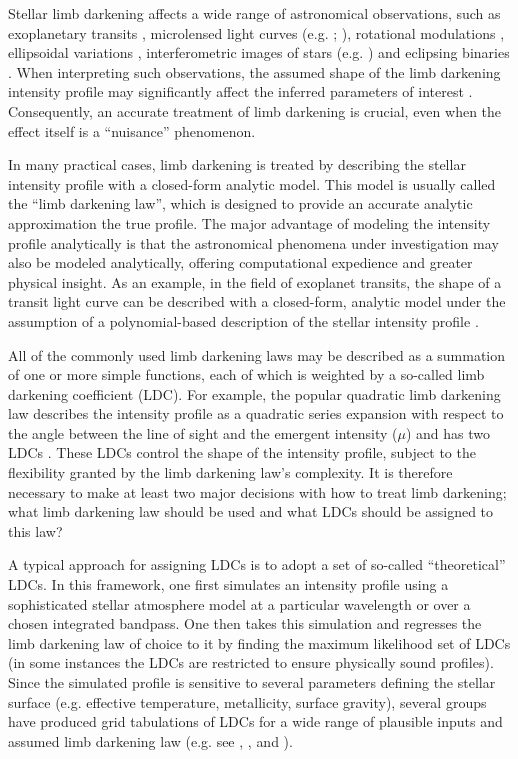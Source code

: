 
Stellar limb darkening affects a wide range of astronomical observations, such
as exoplanetary transits \citep{mandel:2002}, microlensed light curves 
(e.g. \citealt{witt:1995}; \citealt{zub:2011}), rotational modulations 
\citep{macula:2012}, ellipsoidal variations \citep{morris:1993}, interferometric 
images of stars (e.g. \citealt{aufdenberg:1995}) and eclipsing binaries 
\citep{kopal:1950}. When interpreting such observations, the assumed shape of 
the limb darkening intensity profile may significantly affect the inferred 
parameters of interest \citep{csizmadia:2013}. Consequently, an accurate 
treatment of limb darkening is crucial, even when the effect itself is a 
``nuisance'' phenomenon.

In many practical cases, limb darkening is treated by describing the stellar 
intensity profile with a closed-form analytic model. This model is usually 
called the ``limb darkening law'', which is designed to provide an accurate 
analytic approximation the true profile. The major advantage of modeling the
intensity profile analytically is that the astronomical phenomena under
investigation may also be modeled analytically, offering computational
expedience and greater physical insight. As an example, in the field of 
exoplanet transits, the shape of a transit light curve can be described with 
a closed-form, analytic model under the assumption of a polynomial-based 
description of the stellar intensity profile \citep{mandel:2002,gimenez:2006}.

All of the commonly used limb darkening laws may be described as a summation of
one or more simple functions, each of which is weighted by a so-called limb
darkening coefficient (LDC). For example, the popular quadratic limb darkening 
law describes the intensity profile as a quadratic series expansion with respect 
to the angle between the line of sight and the emergent intensity ($\mu$) and
has two LDCs \citep{kopal:1950}. These LDCs control the shape of the intensity 
profile, subject to the flexibility granted by the limb darkening law's 
complexity. It is therefore necessary to make at least two major decisions 
with how to treat limb darkening; what limb darkening law should be used and 
what LDCs should be assigned to this law?

A typical approach for assigning LDCs is to adopt a set of so-called 
``theoretical'' LDCs. In this framework, one first simulates an intensity 
profile using a sophisticated stellar atmosphere model at a particular 
wavelength or over a chosen integrated bandpass. One then takes this 
simulation and regresses the limb darkening law of choice to it by finding
the maximum likelihood set of LDCs (in some instances the LDCs are restricted
to ensure physically sound profiles). Since the simulated profile is sensitive 
to several parameters defining the stellar surface (e.g. effective temperature, 
metallicity, surface gravity), several groups have produced grid tabulations of 
LDCs for a wide range of plausible inputs and assumed limb darkening law (e.g.
see \citealt{vanhamme:1993}, \citealt{diaz:1995}, \citealt{claret:2000} and
\citealt{sing:2010}).

